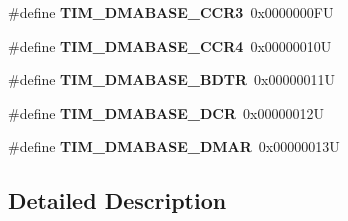 \begin{DoxyCompactItemize}
\#define {\bfseries T\+I\+M\+\_\+\+D\+M\+A\+B\+A\+S\+E\+\_\+\+C\+C\+R3}~0x0000000\+FU
\item 
\mbox{\label{group___t_i_m___d_m_a___base__address_gaea24fd3f528163da065cbdce3c68ef23}} 
\#define {\bfseries T\+I\+M\+\_\+\+D\+M\+A\+B\+A\+S\+E\+\_\+\+C\+C\+R4}~0x00000010U
\item 
\mbox{\label{group___t_i_m___d_m_a___base__address_ga767eab033d485d32de80b46f70be3341}} 
\#define {\bfseries T\+I\+M\+\_\+\+D\+M\+A\+B\+A\+S\+E\+\_\+\+B\+D\+TR}~0x00000011U
\item 
\mbox{\label{group___t_i_m___d_m_a___base__address_gab3e5aaf0cb815b4a2469d3046eca0201}} 
\#define {\bfseries T\+I\+M\+\_\+\+D\+M\+A\+B\+A\+S\+E\+\_\+\+D\+CR}~0x00000012U
\item 
\mbox{\label{group___t_i_m___d_m_a___base__address_gafc79c60f0295d440ba3ed3bb3c73c739}} 
\#define {\bfseries T\+I\+M\+\_\+\+D\+M\+A\+B\+A\+S\+E\+\_\+\+D\+M\+AR}~0x00000013U
\end{DoxyCompactItemize}


\subsection{Detailed Description}
